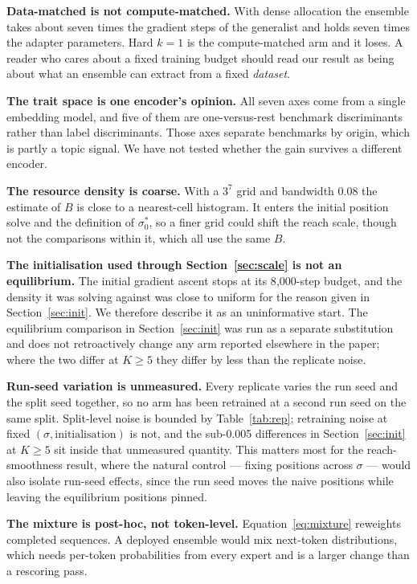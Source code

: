\documentclass{article}
\begin{document}
\textbf{Data-matched is not compute-matched.} With dense allocation the ensemble takes about seven
times the gradient steps of the generalist and holds seven times the adapter parameters. Hard
$k{=}1$ is the compute-matched arm and it loses. A reader who cares about a fixed training budget
should read our result as being about what an ensemble can extract from a fixed \emph{dataset}.

\textbf{The trait space is one encoder's opinion.} All seven axes come from a single embedding model,
and five of them are one-versus-rest benchmark discriminants rather than label discriminants. Those
axes separate benchmarks by origin, which is partly a topic signal. We have not tested whether the
gain survives a different encoder.

\textbf{The resource density is coarse.} With a $3^7$ grid and bandwidth 0.08 the estimate of $B$ is
close to a nearest-cell histogram. It enters the initial position solve and the definition of
$\sigma_0^*$, so a finer grid could shift the reach scale, though not the comparisons within it,
which all use the same $B$.

\textbf{The initialisation used through Section~\ref{sec:scale} is not an equilibrium.} The initial
gradient ascent stops at its 8{,}000-step budget, and the density it was solving against was close to
uniform for the reason given in Section~\ref{sec:init}. We therefore describe it as an uninformative
start. The equilibrium comparison in Section~\ref{sec:init} was run as a separate substitution and
does not retroactively change any arm reported elsewhere in the paper; where the two differ at
$K \ge 5$ they differ by less than the replicate noise.

\textbf{Run-seed variation is unmeasured.} Every replicate varies the run seed and the split seed
together, so no arm has been retrained at a second run seed on the same split. Split-level noise is
bounded by Table~\ref{tab:rep}; retraining noise at fixed $(\sigma, \text{initialisation})$ is not,
and the sub-0.005 differences in Section~\ref{sec:init} at $K \ge 5$ sit inside that unmeasured
quantity. This matters most for the reach-smoothness result, where the natural control --- fixing
positions across $\sigma$ --- would also isolate run-seed effects, since the run seed moves the naive
positions while leaving the equilibrium positions pinned.

\textbf{The mixture is post-hoc, not token-level.} Equation~\ref{eq:mixture} reweights completed
sequences. A deployed ensemble would mix next-token distributions, which needs per-token
probabilities from every expert and is a larger change than a rescoring pass.
\end{document}
